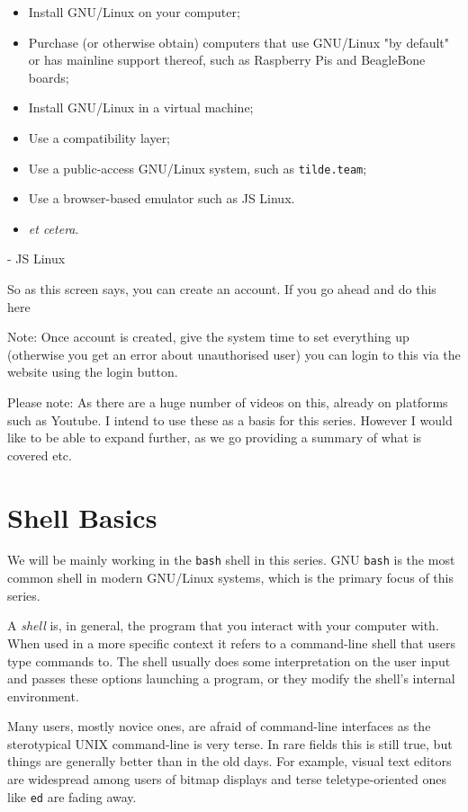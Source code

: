 \documentclass{extbook}
\begin{document}
\begin{itemize}
	\item Install GNU/Linux on your computer;
	\item Purchase (or otherwise obtain) computers that use GNU/Linux "by default" or has mainline support thereof, such as Raspberry Pis and BeagleBone boards;
	\item Install GNU/Linux in a virtual machine;
	\item Use a compatibility layer;
	\item Use a public-access GNU/Linux system, such as \texttt{tilde.team};
	\item Use a browser-based emulator such as JS Linux.
	\item \textit{et cetera}.
\end{itemize}


-   JS Linux

So as this screen says, you can create an account. If you go ahead and
do this here

Note: Once account is created, give the system time to set everything up
(otherwise you get an error about unauthorised user) you can login to
this via the website using the login button.

Please note: As there are a huge number of videos on this, already on
platforms such as Youtube. I intend to use these as a basis for this
series. However I would like to be able to expand further, as we go
providing a summary of what is covered etc.

\chapter{Shell Basics}

We will be mainly working in the \texttt{bash} shell in this series.  GNU \texttt{bash} is the most common shell in modern GNU/Linux systems, which is the primary focus of this series.

A \textit{shell} is, in general, the program that you interact with your computer with.  When used in a more specific context it refers to a command-line shell that users type commands to.  The shell usually does some interpretation on the user input and passes these options launching a program, or they modify the shell's internal environment.

Many users, mostly novice ones, are afraid of command-line interfaces as the sterotypical UNIX command-line is very terse.  In rare fields this is still true, but things are generally better than in the old days.  For example, visual text editors are widespread among users of bitmap displays and terse teletype-oriented ones like \texttt{ed} are fading away.
\end{document}
